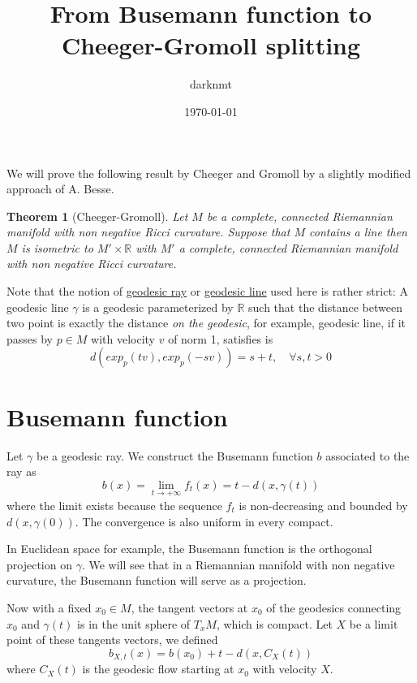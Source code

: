 \documentclass[11pt]{article}
\author{darknmt}
\date{\today}
\title{From Busemann function to Cheeger-Gromoll splitting}
\newtheorem{theorem}{Theorem}
\begin{document}
\maketitle
\tableofcontents

We will prove the following result by Cheeger and Gromoll by a slightly modified approach of
A. Besse.


\begin{theorem}[Cheeger-Gromoll]
\label{orgcf44fbf}
\label{thm:cheeger-gromoll}
Let \(M\) be a complete, connected Riemannian manifold with non negative Ricci curvature. Suppose
that \(M\) contains a line then \(M\) is isometric to \(M'\times \mathbb{R}\) with \(M'\) a complete,
connected Riemannian manifold with non negative Ricci curvature.
\end{theorem}

Note that the notion of \uline{geodesic ray} or \uline{geodesic line} used here is rather strict: A geodesic
line \(\gamma\) is a geodesic parameterized by \(\mathbb{R}\) such that the distance between two point is
exactly the distance \emph{on the geodesic}, for example, geodesic line, if it passes by \(p\in M\) with
velocity \(v\) of norm 1, satisfies is
\[
d(exp_p(tv), exp_p(-sv)) = s+t,\quad \forall s,t>0
\]


\section{Busemann function}
\label{sec:org3ace855}

Let \(\gamma\) be a geodesic ray. We construct the Busemann function \(b\) associated to the ray as
\[
b(x) = \lim_{t\to+\infty}f_t(x) = t - d(x,\gamma(t))
\]
where the limit exists because the sequence \(f_t\) is non-decreasing and bounded by
\(d(x,\gamma(0))\). The convergence is also uniform in every compact. 


In Euclidean space for example, the Busemann function is the orthogonal projection on \(\gamma\). We
will see that in a Riemannian manifold with non negative curvature, the Busemann function will serve
as a projection.


Now with a fixed \(x_0\in M\), the tangent vectors at \(x_0\) of the geodesics connecting \(x_0\) and
\(\gamma(t)\) is in the unit sphere of \(T_xM\), which is compact. Let \(X\) be a limit point of these
tangents vectors, we defined
\[
b_{X,t}(x) = b(x_0) + t - d(x, C_X(t))
\]
where \(C_X(t)\) is the geodesic flow starting at \(x_0\) with velocity \(X\).
\end{document}

